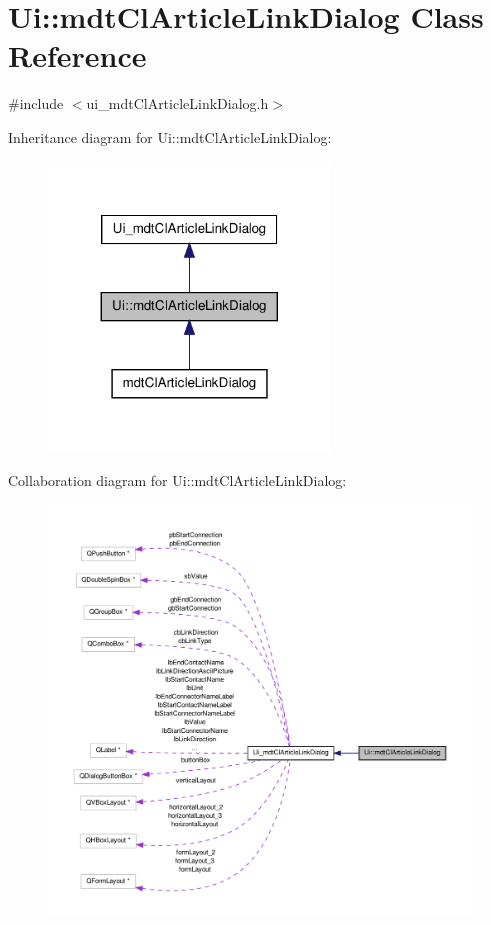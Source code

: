 \hypertarget{class_ui_1_1mdt_cl_article_link_dialog}{\section{Ui\-:\-:mdt\-Cl\-Article\-Link\-Dialog Class Reference}
\label{class_ui_1_1mdt_cl_article_link_dialog}
}


{\ttfamily \#include $<$ui\-\_\-mdt\-Cl\-Article\-Link\-Dialog.\-h$>$}



Inheritance diagram for Ui\-:\-:mdt\-Cl\-Article\-Link\-Dialog\-:\nopagebreak
\begin{figure}[H]
\begin{center}
\leavevmode
\includegraphics[width=212pt]{class_ui_1_1mdt_cl_article_link_dialog__inherit__graph}
\end{center}
\end{figure}


Collaboration diagram for Ui\-:\-:mdt\-Cl\-Article\-Link\-Dialog\-:\nopagebreak
\begin{figure}[H]
\begin{center}
\leavevmode
\includegraphics[width=350pt]{class_ui_1_1mdt_cl_article_link_dialog__coll__graph}
\end{center}
\end{figure}
